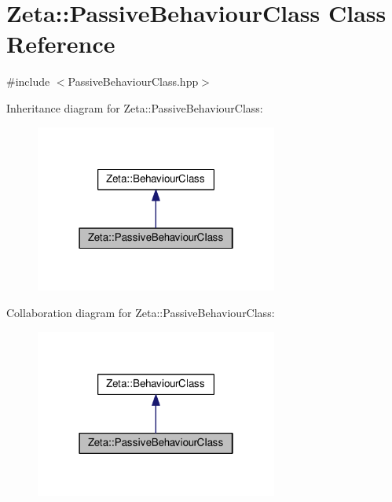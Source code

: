 \hypertarget{classZeta_1_1PassiveBehaviourClass}{\section{Zeta\+:\+:Passive\+Behaviour\+Class Class Reference}
\label{classZeta_1_1PassiveBehaviourClass}
}


{\ttfamily \#include $<$Passive\+Behaviour\+Class.\+hpp$>$}



Inheritance diagram for Zeta\+:\+:Passive\+Behaviour\+Class\+:\nopagebreak
\begin{figure}[H]
\begin{center}
\leavevmode
\includegraphics[width=226pt]{classZeta_1_1PassiveBehaviourClass__inherit__graph}
\end{center}
\end{figure}


Collaboration diagram for Zeta\+:\+:Passive\+Behaviour\+Class\+:\nopagebreak
\begin{figure}[H]
\begin{center}
\leavevmode
\includegraphics[width=226pt]{classZeta_1_1PassiveBehaviourClass__coll__graph}
\end{center}
\end{figure}
